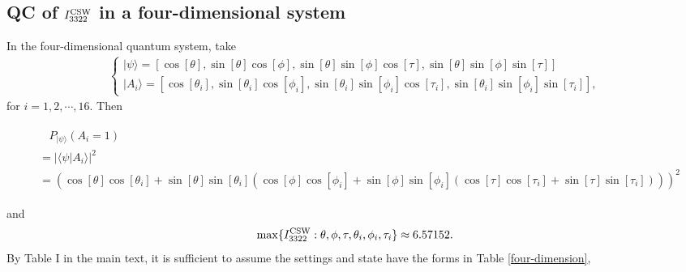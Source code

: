 \documentclass[pra,aps,notitlepage,superscriptaddress,showpacs,showkeys]{revtex4-1}
\theoremstyle{definition}
\theoremstyle{remark}
\begin{document}
\subsection{QC of $I_{3322}^{\rm CSW}$ in a four-dimensional system}




 In the four-dimensional quantum system, take
\begin{eqnarray}
\left\{
  \begin{array}{ll}
    |\psi\rangle=[\cos{[\theta]},\sin{[\theta]}\cos{[\phi]},
\sin{[\theta]}\sin{[\phi]}\cos{[\tau]},
\sin{[\theta]}\sin{[\phi]}\sin{[\tau]}] \\
    |A_i\rangle=[\cos{[\theta_i]},\sin{[\theta_i]}\cos{[\phi_i]},
\sin{[\theta_i]}\sin{[\phi_i]}\cos{[\tau_i]},
\sin{[\theta_i]}\sin{[\phi_i]}\sin{[\tau_i]}],
  \end{array}
\right.
\end{eqnarray}
for $i=1,2,\cdots, 16$. Then
\begin{widetext}
\begin{eqnarray}
\begin{split}
&~~~~P_{|\psi\rangle}(A_i=1)\\
&= |\langle \psi|A_i\rangle|^2\\
&=(\cos{[\theta]}\cos{[\theta_i]}+\sin{[\theta]}\sin{[\theta_i]}(\cos{[\phi]}\cos{[\phi_i]}
+\sin{[\phi]}\sin{[\phi_i]}(\cos{[\tau]}\cos{[\tau_i]}+\sin{[\tau]}\sin{[\tau_i]})))^2
\end{split}
\end{eqnarray}
\end{widetext} and
$$\max\{I_{3322}^{\rm CSW}:\theta,\phi,\tau,\theta_i,\phi_i,\tau_i\}\approx 6.57152.$$
By Table I in the main text, it is sufficient to assume the settings and state have the forms in Table \ref{four-dimension},
\end{document}
